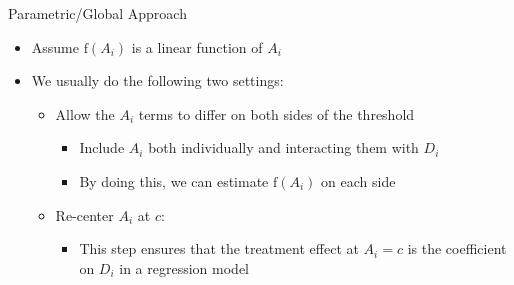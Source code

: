 \documentclass[hyperref={pdfpagelabels=false}]{beamer}
\begin{document}
\begin{frame}{Parametric/Global Approach}
	\begin{itemize}
		
		\item Assume $\mathrm{f}(A_i)$ is a linear function of $A_{i}$
		\vspace{0.2cm}
		\item We usually do the following two settings:
		\vspace{0.2cm}
			\begin{itemize}
		\item[1] Allow the $A_i$ terms to differ on both sides of the threshold 
				\vspace{0.2cm}
			\begin{itemize}
			\item Include $A_{i}$ both individually and interacting them with $D_i$
			\vspace{0.2cm}
			\item By doing this, we can estimate $\mathrm{f}(A_i)$ on each side
						\vspace{0.2cm}
		\end{itemize}
			\item[2] Re-center $A_{i}$ at $c$: 
		\vspace{0.2cm}
		\begin{itemize}
			\item This step ensures that the treatment effect at $A_i=c$ is the coefficient on $D_i$ in a regression model 
		\end{itemize}
		
			\end{itemize}
	
	
		
		
		
		
		
		
	\end{itemize}
\end{frame}
\end{document}
